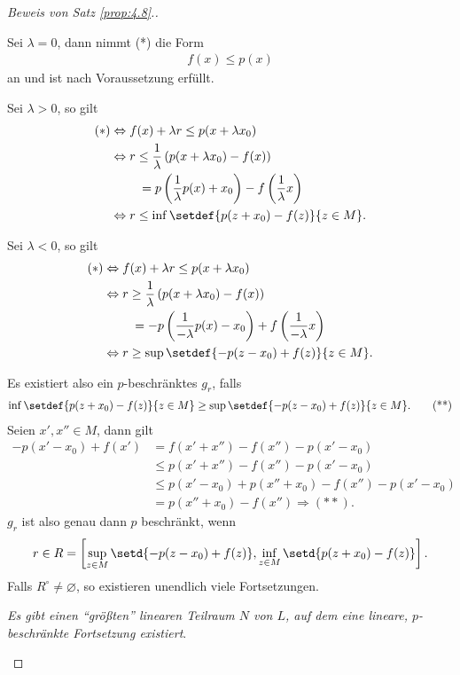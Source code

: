 \begin{proof}[Beweis von Satz \ref{prop:4.8}.]
\begin{proofenum}
\begin{defnenum}
  \item Sei $\lambda = 0$, dann nimmt (*) die Form
\begin{align*}
f(x) \le p(x)
\end{align*}
an und ist nach Voraussetzung erfüllt.
\item Sei $\lambda > 0$, so gilt
\begin{align*}
(*) &\Leftrightarrow f(x)+\lambda r \le p(x+\lambda x_0)\\
&\Leftrightarrow r \le \frac{1}{\lambda}\left(p(x+\lambda x_0) - f(x) \right)\\
&\;\qquad = p\left(\frac{1}{\lambda}p(x)+ x_0\right) -
f\left(\frac{1}{\lambda}x\right)\\
&\Leftrightarrow
r\le \inf\setdef{p(z+x_0)-f(z)}{z\in M}.
\end{align*}
\item Sei $\lambda < 0$, so gilt
\begin{align*}
(*) &\Leftrightarrow f(x)+\lambda r \le p(x+\lambda x_0)\\
&\Leftrightarrow r \ge \frac{1}{\lambda}\left(p(x+\lambda x_0) - f(x) \right)\\
&\;\qquad = -p\left(\frac{1}{-\lambda}p(x)- x_0\right) +
f\left(\frac{1}{-\lambda}x\right)\\
&\Leftrightarrow
r\ge \sup\setdef{-p(z-x_0)+f(z)}{z\in M}.
\end{align*}
\end{defnenum}
Es existiert also ein $p$-beschränktes $g_r$, falls
\begin{align*}
\inf\setdef{p(z+x_0)-f(z)}{z\in M} \ge \sup\setdef{-p(z-x_0)+f(z)}{z\in
M}.\tag{**}
\end{align*}
Seien $x',x''\in M$, dann gilt
\begin{align*}
-p(x'-x_0)+f(x')
&= f(x'+x'')-f(x'') - p(x'-x_0)\\
&\le
p(x'+x'') - f(x'') - p(x'-x_0)\\
&\le
p(x'-x_0)+p(x''+x_0) - f(x'')-p(x'-x_0)\\
&= p(x''+x_0)-f(x'')\Rightarrow (**).
\end{align*}
$g_r$ ist also genau dann $p$ beschränkt, wenn
\begin{align*}
r\in R=\left[\sup_{z\in M}\setd{-p(z-x_0)+f(z)},\inf_{z\in
M}\setd{p(z+x_0)-f(z)}\right].
\end{align*}
Falls $R^\circ\neq \varnothing$, so existieren unendlich viele Fortsetzungen.
\item \textit{Es gibt einen ``größten'' linearen Teilraum $N$ von $L$, auf dem
eine lineare, $p$-beschränkte Fortsetzung existiert}.


\end{proofenum}
\end{proof}
